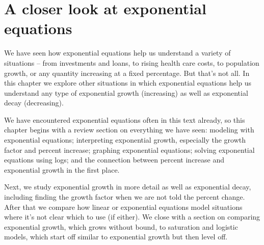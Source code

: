 

\chapter{A closer look at exponential equations}

We have seen how exponential equations help us understand a variety of situations -- from investments and loans, to rising health care costs, to population growth, or any quantity increasing at a fixed percentage.  But that's not all.  In this chapter we explore other situations in which exponential equations help us understand any type of exponential growth (increasing) as well as exponential decay (decreasing).  

We have encountered exponential equations often in this text already, so this chapter begins with a review section on everything we have seen:  modeling with exponential equations; interpreting exponential growth, especially the growth factor and percent increase; graphing exponential equations; solving exponential equations using logs; and the connection between percent increase and exponential growth in the first place.

Next, we study exponential growth in more detail as well as exponential decay, including finding the growth factor when we are not told the percent change.  After that we compare how linear or exponential equations model situations where it's not clear which to use (if either).  We close with a section on comparing exponential growth, which grows without bound, to saturation and logistic models, which start off similar to exponential growth but then level off.

